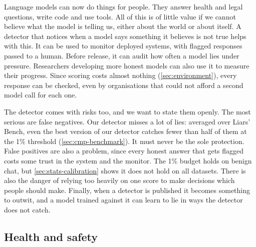 Language models can now do things for people. They answer health and legal questions, write
code and use tools. All of this is of little value if we cannot believe what the model is telling us,
either about the world or about itself. A detector that notices when a model says something it
believes is not true helps with this. It can be used to monitor deployed systems, with flagged
responses passed to a human. Before release, it can audit how often a model lies under
pressure. Researchers developing more honest models can also use it to measure their
progress. Since scoring costs almost nothing (\cref{sec:environment}), every response can be checked, even by
organisations that could not afford a second model call for each one.

The detector comes with risks too, and we want to state them openly. The most serious are
false negatives. Our detector misses a lot of lies: averaged over Liars' Bench, even the best
version of our detector catches fewer than half of them at the 1\% threshold (\cref{sec:cmp-benchmark}). It must
never be the sole protection. False positives are also a problem, since every honest answer that
gets flagged costs some trust in the system and the monitor. The 1\% budget holds on benign
chat, but \cref{sec:stats-calibration} shows it does not hold on all datasets. There is also the danger of relying
too heavily on one score to make decisions which people should make. Finally, when a detector
is published it becomes something to outwit, and a model trained against it can learn to lie in
ways the detector does not catch.

\subsection{Health and safety}

